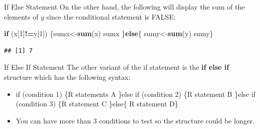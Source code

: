 \documentclass[
  ignorenonframetext,
]{beamer}
\newenvironment{Shaded}{\begin{snugshade}}{\end{snugshade}}
\newcommand{\ControlFlowTok}[1]{\textcolor[rgb]{0.13,0.29,0.53}{\textbf{#1}}}
\newcommand{\DecValTok}[1]{\textcolor[rgb]{0.00,0.00,0.81}{#1}}
\newcommand{\FunctionTok}[1]{\textcolor[rgb]{0.13,0.29,0.53}{\textbf{#1}}}
\newcommand{\NormalTok}[1]{#1}
\newcommand{\OtherTok}[1]{\textcolor[rgb]{0.56,0.35,0.01}{#1}}
\newcommand{\SpecialCharTok}[1]{\textcolor[rgb]{0.81,0.36,0.00}{\textbf{#1}}}
\begin{document}
\begin{frame}[fragile]{If Else Statement}
\protect\hypertarget{if-else-statement-1}{}
On the other hand, the following will display the sum of the elements of
\(y\) since the conditional statement is FALSE:

\small

\begin{Shaded}
\begin{Highlighting}[]
\ControlFlowTok{if}\NormalTok{ (x[}\DecValTok{1}\NormalTok{]}\SpecialCharTok{!=}\NormalTok{y[}\DecValTok{1}\NormalTok{])}
\NormalTok{\{sumx}\OtherTok{\textless{}{-}}\FunctionTok{sum}\NormalTok{(x)}
\NormalTok{sumx}
\NormalTok{\}}\ControlFlowTok{else}\NormalTok{\{}
\NormalTok{  sumy}\OtherTok{\textless{}{-}}\FunctionTok{sum}\NormalTok{(y)}
\NormalTok{  sumy\}}
\end{Highlighting}
\end{Shaded}

\begin{verbatim}
## [1] 7
\end{verbatim}

\normalsize
\end{frame}

\begin{frame}{If Else If Statement}
\protect\hypertarget{if-else-if-statement}{}
The other variant of the if statement is the \textbf{if else if}
structure which has the following syntax:

\begin{itemize}
\item
  if (condition 1) \{R statements A \}else if (condition 2) \{R
  statement B \}else if (condition 3) \{R statement C \}else\{ R
  statement D\}
\item
  You can have more than 3 conditions to test so the structure could be
  longer.
\end{itemize}
\end{frame}
\end{document}
